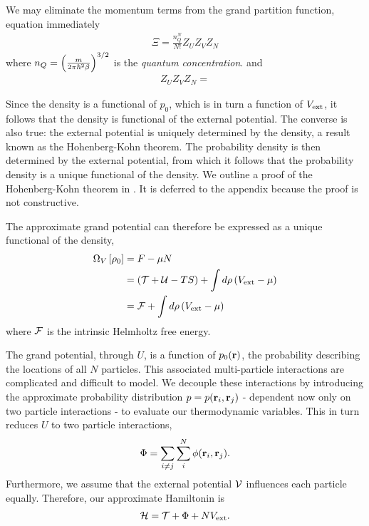 We may eliminate the momentum terms from the grand partition function, equation  immediately
\begin{align}
  \Xi = \frac{n_Q^N}{N!} Z_U Z_V Z_N
\end{align}
where $n_Q = \left( \frac{m}{2\pi\hbar^2 \beta} \right)^{3/2}$ is the {\em quantum concentration}.
and 
\begin{align}
  Z_U Z_V Z_N = 
\end{align}





Since the density is a functional of $p_0$, which is in turn a function of $V_{\text{ext}}$,
it follows that the density is functional of the external potential.
The converse is also true:
the external potential is uniquely determined by the density,
a result known as the Hohenberg-Kohn theorem.
The probability density is then determined by the external potential,
from which it follows that the probability density is a unique functional of the density.
We outline a proof of the Hohenberg-Kohn theorem in .
It is deferred to the appendix because the proof is not constructive.

The approximate  grand potential  can therefore be expressed as a unique functional of the density,
\begin{align}
  \Omega_V\left[ \rho_0 \right] &=  F - \mu N \\
  &= \left( {\cal{T}} + {\cal{U}} - TS \right) + \int d\rho\left(  V_{\text{ext}} -\mu  \right)\\
  &= {\cal F} + \int d\rho\left(  V_{\text{ext}} -\mu  \right)\\
\end{align}
where ${\cal F}$ is the intrinsic Helmholtz free energy.



The grand potential, through $U$, is a function of $p_0({\mathbf{\textbf{r}}})$, the  probability describing the locations of all $N$ particles.
This associated multi-particle interactions are complicated and difficult to model.
We decouple these interactions by introducing the approximate probability distribution  $ p = p(\textbf{r}_i, \textbf{r}_j)$ 
- dependent now only on two particle interactions - 
to evaluate our thermodynamic variables.
This in turn reduces $U$ to two particle interactions, 
\begin{align}
  \Phi = \sum_{i\ne j} \sum_i^N \phi(\textbf{r}_i, \textbf{r}_j).
\end{align}
Furthermore, we assume that the external potential ${\cal{V}}$ influences each particle equally.
Therefore, our approximate Hamiltonin is
\begin{align}
{\cal H} = {\cal{T}} + \Phi + NV_{\text{ext}}.
\end{align}


